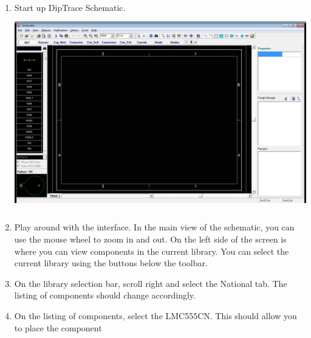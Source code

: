 \documentclass[letterpaper]{article}
\newcounter{saveenum}
\newcommand\liststyleRTFNumvi{%
\renewcommand\theenumi{\arabic{enumi}}
\renewcommand\theenumii{\alph{enumii}}
\renewcommand\theenumiii{\roman{enumiii}}
\renewcommand\theenumiv{\arabic{enumiv}}
\renewcommand\labelenumi{\theenumi.}
\renewcommand\labelenumii{\theenumii.}
\renewcommand\labelenumiii{\theenumiii.}
\renewcommand\labelenumiv{\theenumiv.}
}
\begin{document}
\liststyleRTFNumvi
\setcounter{saveenum}{\value{enumi}}
\begin{enumerate}
\setcounter{enumi}{\value{saveenum}}
\item {\sffamily\color[rgb]{0.30980393,0.5058824,0.7411765}
Start up DipTrace Schematic.\newline
 \includegraphics[width=5.4in,height=3.3665in]{figures/ee4document-img018.png} }
\item {\sffamily\color[rgb]{0.30980393,0.5058824,0.7411765}
Play around with the interface.\newline
In the main view of the schematic, you can use the mouse wheel to zoom in and out.\newline
On the left side of the screen is where you can view components in the current library.\newline
You can select the current library using the buttons below the toolbar.}
\item {\sffamily\color[rgb]{0.30980393,0.5058824,0.7411765}
On the library selection bar, scroll right and select the {\textquotedbl}National{\textquotedbl} tab. The listing of
components should change accordingly.}
\item {\sffamily\color[rgb]{0.30980393,0.5058824,0.7411765}
On the listing of components, select the LMC555CN. This should allow you to place the component}
\end{enumerate}
\end{document}
